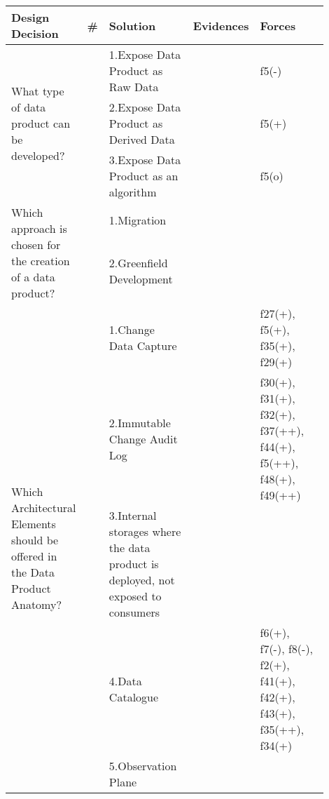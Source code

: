 \begin{tabular}{|p{0.12\linewidth}|p{0.015\linewidth}|p{0.3\linewidth}|p{0.15\linewidth}|p{0.31\linewidth}|}
\hline
{\bf Design Decision} & {\bf \#} & {\bf Solution} & {\bf Evidences} & {\bf Forces}\\
\hline
\multirow{3}{\linewidth}{What type of data product can be developed?} &\cellcolor{emerald_shape_3}{} &1.Expose Data Product as Raw Data&\cellcolor{emerald_shape_7}{s1, s2, s6, s7, s9, s14, s15, s27, s34, s43} & f5(-)\\
 & \cellcolor{emerald_shape_3}{} & 2.Expose Data Product as Derived Data&\cellcolor{emerald_shape_7}{s1, s2, s6, s9, s14, s15, s27, s34} & f5(+)\\
 & \multirow{-3}{\linewidth}{ \cellcolor{emerald_shape_3}{10}} &3.Expose Data Product as an algorithm&\cellcolor{emerald_shape_4}{s2, s6} & f5(o)\\
\multirow{2}{\linewidth}{Which approach is chosen for the creation of a data product?} &\cellcolor{emerald_shape_6}{} &1.Migration&\cellcolor{emerald_shape_5}{s7, s8, s9, s23, s38, s39, s41, s43, s44, s45, s48, s56, s57} & \\
 & \multirow{-2}{\linewidth}{ \cellcolor{emerald_shape_6}{34}} &2.Greenfield Development&\cellcolor{emerald_shape_7}{s1, s2, s3, s5, s6, s7, s8, s9, s11, s14, s15, s18, s20, s23, s25, s28, s30, s31, s32, s33, s35, s37, s38, s39, s40, s41, s42, s43, s45, s49} & \\
\multirow{6}{\linewidth}{Which Architectural Elements should be offered in the Data Product Anatomy?} &\cellcolor{emerald_shape_6}{} &1.Change Data Capture&\cellcolor{emerald_shape_4}{s4, s17, s20, s38, s45, s48, s53, s54, s55, s56} & f27(+), f5(+), f35(+), f29(+)\\
 & \cellcolor{emerald_shape_6}{} & 2.Immutable Change Audit Log&\cellcolor{emerald_shape_5}{s4, s8, s12, s31, s32, s35, s36, s45, s47, s48, s53, s54, s55, s56, s57} & f30(+), f31(+), f32(+), f37(++), f44(+), f5(++), f48(+), f49(++)\\
 & \cellcolor{emerald_shape_6}{} & 3.Internal storages where the data product is deployed, not exposed to consumers&\cellcolor{emerald_shape_3}{s4, s13, s15, s32, s33, s36, s49} & \\
 & \cellcolor{emerald_shape_6}{} & 4.Data Catalogue&\cellcolor{emerald_shape_5}{s1, s3, s5, s7, s9, s15, s16, s25, s30, s31, s32, s37, s43, s47, s48, s53, s55} & f6(+), f7(-), f8(-), f2(+), f41(+), f42(+), f43(+), f35(++), f34(+)\\
 & \cellcolor{emerald_shape_6}{} & 5.Observation Plane&\cellcolor{emerald_shape_3}{s3, s7, s11, s13, s22, s52} & \\

\end{tabular}
